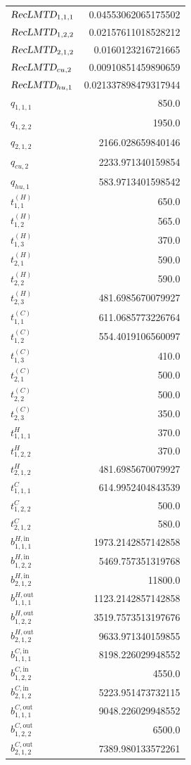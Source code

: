 \documentclass{article}%
\begin{document}
\begin{multicols*}{3}
\begin{supertabular}{lr}
	$\textsl{RecLMTD}_{1,1,1}$ & 0.04553062065175502 \\%
	$\textsl{RecLMTD}_{1,2,2}$ & 0.02157611018528212 \\%
	$\textsl{RecLMTD}_{2,1,2}$ & 0.0160123216721665 \\%
	$\textsl{RecLMTD}_{cu,2}$ & 0.00910851459890659 \\%
	$\textsl{RecLMTD}_{hu,1}$ & 0.021337898479317944 \\%
	$q_{1,1,1}$ & 850.0 \\%
	$q_{1,2,2}$ & 1950.0 \\%
	$q_{2,1,2}$ & 2166.028659840146 \\%
	$q_{cu,2}$ & 2233.971340159854 \\%
	$q_{hu,1}$ & 583.9713401598542 \\%
	$t_{1,1}^{(H)}$ & 650.0 \\%
	$t_{1,2}^{(H)}$ & 565.0 \\%
	$t_{1,3}^{(H)}$ & 370.0 \\%
	$t_{2,1}^{(H)}$ & 590.0 \\%
	$t_{2,2}^{(H)}$ & 590.0 \\%
	$t_{2,3}^{(H)}$ & 481.6985670079927 \\%
	$t_{1,1}^{(C)}$ & 611.0685773226764 \\%
	$t_{1,2}^{(C)}$ & 554.4019106560097 \\%
	$t_{1,3}^{(C)}$ & 410.0 \\%
	$t_{2,1}^{(C)}$ & 500.0 \\%
	$t_{2,2}^{(C)}$ & 500.0 \\%
	$t_{2,3}^{(C)}$ & 350.0 \\%
	$t_{1,1,1}^{H}$ & 370.0 \\%
	$t_{1,2,2}^{H}$ & 370.0 \\%
	$t_{2,1,2}^{H}$ & 481.6985670079927 \\%
	$t_{1,1,1}^{C}$ & 614.9952404843539 \\%
	$t_{1,2,2}^{C}$ & 500.0 \\%
	$t_{2,1,2}^{C}$ & 580.0 \\%
	$b_{1,1,1}^{H,\text{in}}$ & 1973.2142857142858 \\%
	$b_{1,2,2}^{H,\text{in}}$ & 5469.757351319768 \\%
	$b_{2,1,2}^{H,\text{in}}$ & 11800.0 \\%
	$b_{1,1,1}^{H,\text{out}}$ & 1123.2142857142858 \\%
	$b_{1,2,2}^{H,\text{out}}$ & 3519.7573513197676 \\%
	$b_{2,1,2}^{H,\text{out}}$ & 9633.971340159855 \\%
	$b_{1,1,1}^{C,\text{in}}$ & 8198.226029948552 \\%
	$b_{1,2,2}^{C,\text{in}}$ & 4550.0 \\%
	$b_{2,1,2}^{C,\text{in}}$ & 5223.951473732115 \\%
	$b_{1,1,1}^{C,\text{out}}$ & 9048.226029948552 \\%
	$b_{1,2,2}^{C,\text{out}}$ & 6500.0 \\%
	$b_{2,1,2}^{C,\text{out}}$ & 7389.980133572261 \\%
\end{supertabular}%
\end{multicols*}%
\clearpage%
\end{document}
